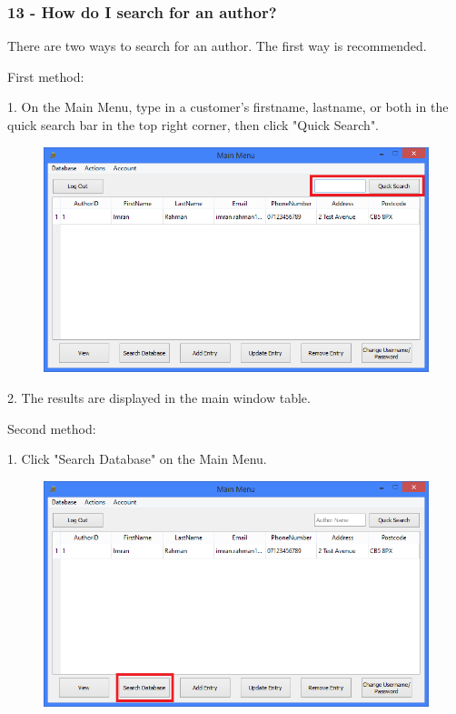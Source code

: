 \subsubsection{13 - How do I search for an author?} \label{sssec:Q13}

There are two ways to search for an author. The first way is recommended.

First method:

1. On the Main Menu, type in a customer's firstname, lastname, or both in the quick search bar in the top right corner, then click "Quick Search".

\begin{figure}[H]
    \includegraphics[width=\textwidth]{./Manual/Tutorial/Q13/QuickSearch.png}
\end{figure}

2. The results are displayed in the main window table.

Second method:

1. Click "Search Database" on the Main Menu.

\begin{figure}[H]
    \includegraphics[width=\textwidth]{./Manual/Tutorial/Q13/SearchDatabase.png}
\end{figure}

